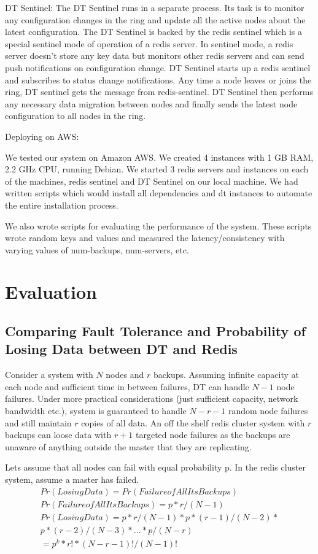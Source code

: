 \documentclass[10pt,twocolumn,letterpaper]{article}
\begin{document}
DT Sentinel: The DT Sentinel runs in a separate process. Its task is to monitor any configuration changes in the ring and update all the active nodes about the latest configuration. The DT Sentinel is backed by the redis sentinel which is a special sentinel mode of operation of a redis server. In sentinel mode, a redis server doesn't store any key data but monitors other redis servers and can send push notifications on configuration change. DT Sentinel starts up a redis sentinel and subscribes to status change notifications. Any time a node leaves or joins the ring, DT sentinel gets the message from redis-sentinel. DT Sentinel then performs any necessary data migration between nodes and finally sends the latest node configuration to all nodes in the ring.

Deploying on AWS:

We tested our system on Amazon AWS. We created 4 instances with 1 GB RAM, 2.2 GHz CPU, running Debian. We started 3 redis servers and instances on each of the machines, redis sentinel  and DT Sentinel on our local machine. We had written scripts which would install all dependencies and dt instances to automate the entire installation process.

We also wrote scripts for evaluating the performance of the system. These scripts wrote random keys and values and measured the latency/consistency with varying values of num-backups, num-servers, etc.


\section{Evaluation} \label{evaluation}

\subsection{Comparing Fault Tolerance and Probability of Losing Data between DT and Redis}
Consider a system with \(N\) nodes and \(r\) backups. Assuming infinite capacity at each node and sufficient time in between failures, DT can handle \(N-1\) node failures. Under more practical considerations (just sufficient capacity, network bandwidth etc.), system is guaranteed to handle \(N - r - 1\) random node failures and still maintain \(r\) copies of all data.
An off the shelf redis cluster system with \(r\) backups can loose data with \(r + 1\) targeted node failures as the backups are unaware of anything outside the master that they are replicating.

Lets assume that all nodes can fail with equal probability p. In the redis cluster system, assume a master has failed. 
\begin{equation}
\label{xx}
\begin{split}
Pr(Losing Data) = Pr(Failure of All Its Backups)\\
Pr(Failure of All Its Backups) = p* r / (N - 1)\\
Pr(Losing Data) = p*r/(N-1) * p*(r-1)/(N-2) *\\
 p*(r-2)/(N-3) * ... * p/(N-r)\\
=p^{k}*r!*(N-r-1)!/(N-1)!\\
\end{split}
\end{equation}
\end{document}
